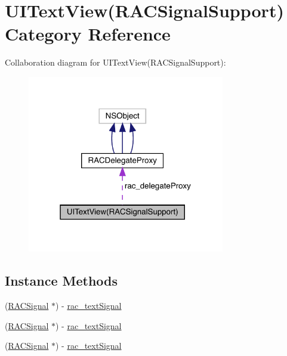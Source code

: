 \hypertarget{category_u_i_text_view_07_r_a_c_signal_support_08}{}\section{U\+I\+Text\+View(R\+A\+C\+Signal\+Support) Category Reference}
\label{category_u_i_text_view_07_r_a_c_signal_support_08}


Collaboration diagram for U\+I\+Text\+View(R\+A\+C\+Signal\+Support)\+:\nopagebreak
\begin{figure}[H]
\begin{center}
\leavevmode
\includegraphics[width=244pt]{category_u_i_text_view_07_r_a_c_signal_support_08__coll__graph}
\end{center}
\end{figure}
\subsection*{Instance Methods}
\begin{DoxyCompactItemize}
\item 
(\mbox{\hyperlink{interface_r_a_c_signal}{R\+A\+C\+Signal}} $\ast$) -\/ \mbox{\hyperlink{category_u_i_text_view_07_r_a_c_signal_support_08_aad510c683b60bb5788035a21f860690d}{rac\+\_\+text\+Signal}}
\item 
(\mbox{\hyperlink{interface_r_a_c_signal}{R\+A\+C\+Signal}} $\ast$) -\/ \mbox{\hyperlink{category_u_i_text_view_07_r_a_c_signal_support_08_aad510c683b60bb5788035a21f860690d}{rac\+\_\+text\+Signal}}
\item 
(\mbox{\hyperlink{interface_r_a_c_signal}{R\+A\+C\+Signal}} $\ast$) -\/ \mbox{\hyperlink{category_u_i_text_view_07_r_a_c_signal_support_08_aad510c683b60bb5788035a21f860690d}{rac\+\_\+text\+Signal}}
\end{DoxyCompactItemize}
